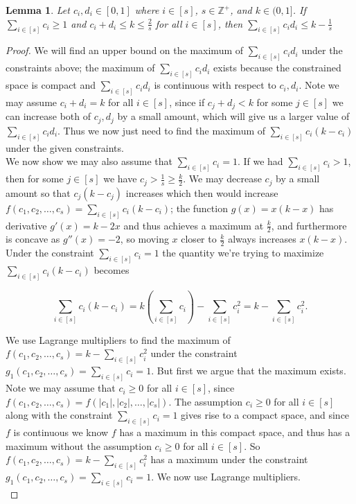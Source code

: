 \documentclass{article}
\newtheorem{lemma}{Lemma}
\begin{document}
\begin{lemma}
Let $c_i, d_i \in [0,1]$ where $i \in [s]$, $s \in \mathbb{Z}^{+}$, and $k \in (0,1]$. If $\sum_{i \in [s]} c_i \geq 1$ and $c_i + d_i \leq k \leq \frac{2}{s}$ for all $i \in [s]$, then $\sum_{i \in [s]} c_id_i \leq k - \frac{1}{s}$  
\end{lemma}

\begin{proof}
We will find an upper bound on the maximum of $\sum_{i \in [s]} c_id_i$ under the constraints above; the maximum of $\sum_{i \in [s]} c_id_i$ exists because the constrained space is compact and $\sum_{i \in [s]} c_id_i$ is continuous with respect to $c_i,d_i$. Note we may assume $c_i+d_i = k$ for all $i \in [s]$, since if $c_j + d_j < k$ for some $j \in [s]$ we can increase both of $c_j,d_j$ by a small amount, which will give us a larger value of $\sum_{i \in [s]} c_id_i$. Thus we now just need to find the maximum of $\sum_{i \in [s]} c_i(k-c_i)$ under the given constraints. \\

We now show we may also assume that $\sum_{i \in [s]} c_i = 1$. If we had $\sum_{i \in [s]} c_i > 1$, then for some $j \in [s]$ we have $c_j > \frac{1}{s} \geq \frac{k}{2}$. We may decrease $c_j$ by a small amount so that $c_j(k-c_j)$ increases which then would increase $f(c_1,c_2,\ldots,c_s) = \sum_{i \in [s]} c_i(k-c_i)$; the function $g(x) = x(k-x)$ has derivative $g'(x) = k - 2x$ and thus achieves a maximum at $\frac{k}{2}$, and furthermore is concave as $g''(x) = -2$, so moving $x$ closer to $\frac{k}{2}$ always increases $x(k-x)$. Under the constraint $\sum_{i \in [s]} c_i = 1$ the quantity we're trying to maximize $\sum_{i \in [s]} c_i(k-c_i)$ becomes 

$$\sum_{i \in [s]} c_i(k-c_i)= k \left( \sum_{i \in [s]} c_i \right) - \sum_{i \in [s]} c_i^2 = k - \sum_{i \in [s]} c_i^2.$$

We use Lagrange multipliers to find the maximum of  $f(c_1,c_2,\ldots,c_s) = k - \sum_{i \in [s]} c_i^2$ under the constraint $g_1(c_1,c_2,\ldots,c_s) = \sum_{i \in [s]} c_i = 1$. But first we argue that the maximum exists. Note we may assume that $c_i \geq 0$ for all $i \in [s]$, since $f(c_1,c_2,\ldots,c_s) = f(|c_1|,|c_2|,\ldots,|c_s|)$. The assumption $c_i \geq 0$ for all $i \in [s]$ along with the constraint $\sum_{i \in [s]} c_i = 1$ gives rise to a compact space, and since $f$ is continuous we know $f$ has a maximum in this compact space, and thus has a maximum without the assumption $c_i \geq 0$ for all $i \in [s]$. So $f(c_1,c_2,\ldots,c_s) = k - \sum_{i \in [s]} c_i^2$ has a maximum under the constraint $g_1(c_1,c_2,\ldots,c_s) = \sum_{i \in [s]} c_i = 1$. We now use Lagrange multipliers. \\


\end{proof}
\end{document}
